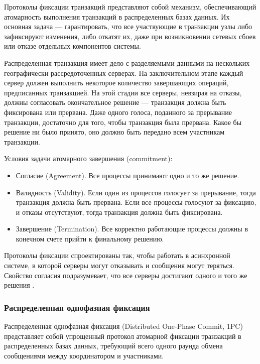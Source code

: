 Протоколы фиксации транзакций представляют собой механизм, обеспечивающий атомарность 
выполнения транзакций в распределенных базах данных. Их основная задача — гарантировать, что все участвующие в 
транзакции узлы либо зафиксируют изменения, либо откатят их, даже при возникновении сетевых сбоев или отказе отдельных 
компонентов системы. \autocite{FixProtocols}

Распределенная транзакция имеет дело с разделяемыми данными на нескольких географически рассредоточенных серверах. 
На заключительном этапе каждый сервер должен выполнить некоторое количество завершающих операций, предписанных транзакцией. 
На этой стадии все серверы, невзирая на отказы, должны согласовать окончательное решение — транзакция должна быть фиксирована 
или прервана. Даже одного голоса, поданного за прерывание транзакции, достаточно для того, чтобы транзакция была прервана.
 Какое бы решение ни было принято, оно должно быть передано всем участникам транзакции. 
 
Условия задачи атомарного завершения (commitment):

\begin{itemize}
    \item Согласие (Agreement). Все процессы принимают одно и то же решение.
    \item Валидность (Validity). Если один из процессов голосует за прерывание, тогда транзакция должна быть прервана. 
    Если все процессы голосуют за фиксацию, и отказы отсутствуют, тогда транзакция должна быть фиксирована.
    \item Завершение (Termination). Все корректно работающие процессы должны в конечном счете прийти к финальному 
    решению.
\end{itemize}

Протоколы фиксации спроектированы так, чтобы работать в асинхронной системе, в которой серверы могут отказывать и сообщения 
могут теряться. Свойство согласия подразумевает, что все серверы достигают одного и того же решения \autocite{Fix}.

\subsubsection{Распределенная однофазная фиксация}

Распределенная однофазная фиксация (Distributed One-Phase Commit, 1PC) представляет собой упрощенный протокол 
атомарной фиксации транзакций в распределенных базах данных, требующий всего одного раунда обмена сообщениями 
между координатором и участниками.

